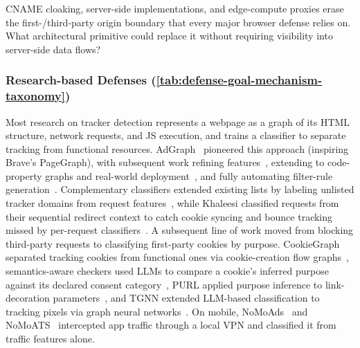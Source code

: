 \begin{opbox}
CNAME cloaking, server-side implementations, and edge-compute proxies erase the first-/third-party origin boundary that every major browser defense relies on. What architectural primitive could replace it without requiring visibility into server-side data flows?
\end{opbox}



\subsubsection{Research-based Defenses (\autoref{tab:defense-goal-mechanism-taxonomy})}
\label{sec:stateful-defenses-research}



%
Most research on tracker detection represents a webpage as a graph of its HTML structure, network requests, and JS execution, and trains a classifier to separate tracking from functional resources.
%
AdGraph~\cite{iqbalAdGraphGraphBasedApproach2020} pioneered this approach (inspiring Brave's PageGraph), with subsequent work refining features~\cite{sibyWebGraphCapturingAdvertising2022,yangWTAGRAPHWebTracking2022}, extending to code-property graphs and real-world deployment~\cite{leeAdCPGClassifyingJavaScript2023,leeAdFlushRealWorldDeployable2024}, and fully automating filter-rule generation~\cite{leAutoFRAutomatedFilter2023}.
%
Complementary classifiers extended existing lists by labeling unlisted tracker domains from request features~\cite{gugelmannAutomatedApproachComplementing2015,ikramSeamlessTrackingFreeWeb2017,reitingerMLCBMachineLearning2021}, while Khaleesi classified requests from their sequential redirect context to catch cookie syncing and bounce tracking missed by per-request classifiers~\cite{iqbalKhaleesiBreakerAdvertising2022}.
A subsequent line of work moved from blocking third-party requests to classifying first-party cookies by purpose.
%
CookieGraph separated tracking cookies from functional ones via cookie-creation flow graphs~\cite{munirCookieGraphUnderstandingDetecting2023}, semantics-aware checkers used LLMs to compare a cookie's inferred purpose against its declared consent category~\cite{chenSemanticsAwareCookiePurpose2025}, PURL applied purpose inference to link-decoration parameters~\cite{munirPURLSafeEffective2024}, and TGNN extended LLM-based classification to tracking pixels via graph neural networks~\cite{xiongTGNNEnhancingPixel2026}.
%
On mobile, NoMoAds~\cite{shubaNoMoAdsEffectiveEfficient2018} and NoMoATS~\cite{shubaNoMoATSAutomaticDetection2020} intercepted app traffic through a local VPN and classified it from traffic features alone.


